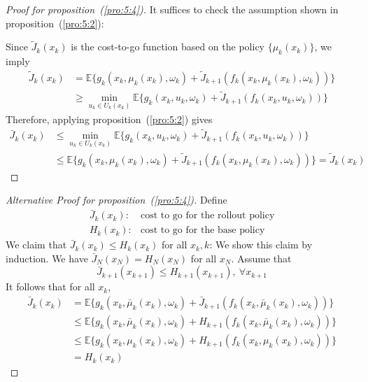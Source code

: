 \begin{proof}[Proof for proposition~(\ref{pro:5:4})]
It suffices to check the assumption shown in proposition~(\ref{pro:5:2}):

Since $\tilde{J}_k(x_k)$ is the cost-to-go function based on the policy $\{\mu_k(x_k)\}$, we imply
\begin{align*}
\tilde{J}_k(x_k)&=\mathbb{E}\Bigg\{
g_k(x_k,\mu_k(x_k),\omega_k)
+
\tilde{J}_{k+1}(f_k(x_k,\mu_k(x_k),\omega_k))
\Bigg\}\\
&\ge
\min_{u_k\in U_k(x_k)}\mathbb{E}\Bigg\{
g_k(x_k,u_k,\omega_k)
+
\tilde{J}_{k+1}(f_k(x_k,u_k,\omega_k))
\Bigg\}
\end{align*}
Therefore, applying proposition~(\ref{pro:5:2}) gives
\begin{align*}
\bar{J}_k(x_k)&\le \min_{u_k\in U_k(x_k)}\mathbb{E}\Bigg\{
g_k(x_k,u_k,\omega_k)
+
\tilde{J}_{k+1}(f_k(x_k,u_k,\omega_k))
\Bigg\}\\
&\le \mathbb{E}\Bigg\{
g_k(x_k,\mu_k(x_k),\omega_k)
+
\tilde{J}_{k+1}(f_k(x_k,\mu_k(x_k),\omega_k))
\Bigg\}=\tilde{J}_k(x_k)
\end{align*}
\end{proof}
\begin{proof}[Alternative Proof for proposition~(\ref{pro:5:4})]
Define
\begin{align*}
\bar{J}_k(x_k):&\text{cost to go for the rollout policy}\\
H_k(x_k):&\text{cost to go for the base policy}
\end{align*}
We claim that $\bar{J}_k(x_k)\le H_k(x_k)$ for all $x_k,k$:
We show this claim by induction. We have $\bar{J}_N(x_N)=H_N(x_N)$ for all $x_N$.
Assume that
\[
\bar{J}_{k+1}(x_{k+1})\le H_{k+1}(x_{k+1}),\ \forall x_{k+1}
\]
It follows that for all $x_k$,
\begin{align*}
\bar{J}_k(x_k)&=\mathbb{E}\Bigg\{
g_k(x_k,\bar{\mu}_k(x_k),\omega_k)+\bar{J}_{k+1}(f_k(x_k,\bar{\mu}_k(x_k),\omega_k))\Bigg\}\\
&\le \mathbb{E}\Bigg\{
g_k(x_k,\bar{\mu}_k(x_k),\omega_k)+H_{k+1}(f_k(x_k,\bar{\mu}_k(x_k),\omega_k))
\Bigg\}\\
&\le 
\mathbb{E}\Bigg\{
g_k(x_k,{\mu}_k(x_k),\omega_k)+H_{k+1}(f_k(x_k,{\mu}_k(x_k),\omega_k))
\Bigg\}\\
&=H_k(x_k)
\end{align*}



\end{proof}





















